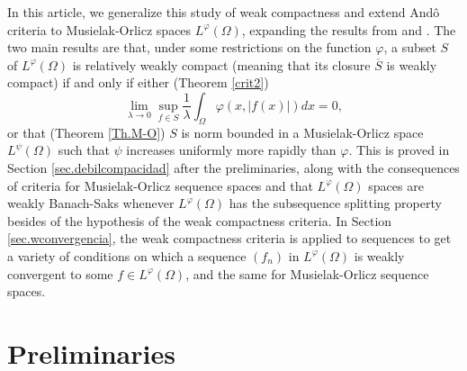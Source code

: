 \documentclass[11pt,a4paper]{amsart}
\newcommand{\lphi}{{L^{\varphi}(\Omega)}}
\newcommand{\lpsi}{{L^{\psi}(\Omega)}}
\begin{document}
In this article, we generalize this study of weak compactness and extend Andô criteria to Musielak-Orlicz spaces $\lphi$, expanding the results from \cite{Nowak} and \cite{PCM3}. The two main results are that, under some restrictions on the function $\varphi$, a subset $S$ of $\lphi$ is relatively weakly compact (meaning that its closure $\overline{S}$ is weakly compact) if and only if either (Theorem \ref{crit2})
$$
\lim_{\lambda\rightarrow 0}\sup_{f\in S} \frac{1}{\lambda}\int_{\Omega} \varphi(x,\vert f(x)\vert) dx=0,
$$
or that (Theorem \ref{Th.M-O}) $S$ is norm bounded in a Musielak-Orlicz space $\lpsi$ such that $\psi$ increases uniformly more rapidly than $\varphi$. This is proved in Section \ref{sec.debilcompacidad} after the preliminaries, along with the consequences of criteria for Musielak-Orlicz sequence spaces and that $\lphi$ spaces are weakly Banach-Saks whenever $\lphi$ has the subsequence splitting property besides of the hypothesis of the weak compactness criteria. In Section \ref{sec.wconvergencia}, the weak compactness criteria is applied to sequences to get a variety of conditions on which a sequence $(f_n)$ in $\lphi$ is weakly convergent to some $f\in\lphi$, and the same for Musielak-Orlicz sequence spaces.


\vspace{-5mm}

\section{Preliminaries}\label{sec.preliminaresç}
\end{document}
